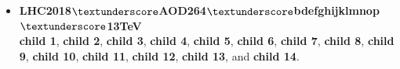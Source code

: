 \begin{itemize}


	\item \textbf{LHC2018$\textunderscore$AOD264$\textunderscore$bdefghijklmnop$\textunderscore$13TeV} \\
	\textbf{child 1}, \textbf{child 2}, \textbf{child 3}, \textbf{child 4}, \textbf{child 5}, \textbf{child 6}, \textbf{child 7}, \textbf{child 8}, \textbf{child 9}, \textbf{child 10}, \textbf{child 11}, \textbf{child 12}, \textbf{child 13}, and \textbf{child 14}.
	

\end{itemize}
